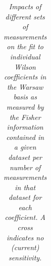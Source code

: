 \documentclass[../report.tex]{subfiles}
\begin{document}
\begin{table}
\begin{tabular}{|c|c|c|c|c|c|c|}
\end{tabular}
\caption{\it Impacts of different sets of measurements on the fit to individual Wilson coefficients in the Warsaw basis as measured by the Fisher information contained in a given dataset per number of measurements in that dataset for each coefficient. A cross indicates no (current) sensitivity.}
\label{tab8:FIpM}
\end{table}
\vspace{5mm}
\end{document}
